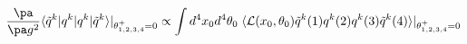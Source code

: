 \begin{equation}\label{ins}
  \frac{\pa}{\pa g^2}\langle \tilde q^k|q^k|q^k |\tilde q^k\rangle|_{\theta^+_{1,2,3,4}=0}  \propto \int d^4x_0d^4\theta_0\; \langle {\cal L}(x_0,\theta_0) \tilde q^k(1) q^k(2) q^k(3) \tilde q^k(4) \rangle|_{\theta^+_{1,2,3,4}=0}  
\end{equation}

